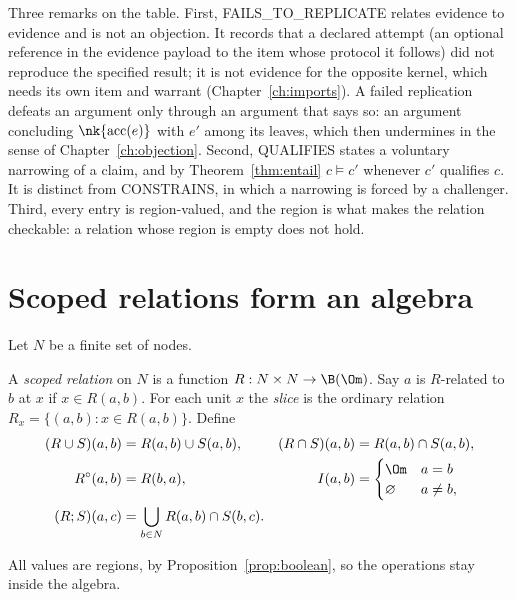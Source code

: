 Three remarks on the table. First, \textsf{FAILS\_TO\_REPLICATE} relates evidence to evidence and is not an objection. It records that a declared attempt (an optional reference in the evidence payload to the item whose protocol it follows) did not reproduce the specified result; it is not evidence for the opposite kernel, which needs its own item and warrant (Chapter~\ref{ch:imports}). A failed replication defeats an argument only through an argument that says so: an argument concluding $\nk{\mathrm{acc}(e)}$ with $e'$ among its leaves, which then undermines in the sense of Chapter~\ref{ch:objection}. Second, \textsf{QUALIFIES} states a voluntary narrowing of a claim, and by Theorem~\ref{thm:entail} $c\models c'$ whenever $c'$ qualifies $c$. It is distinct from \textsf{CONSTRAINS}, in which a narrowing is forced by a challenger. Third, every entry is region-valued, and the region is what makes the relation checkable: a relation whose region is empty does not hold.

\section{Scoped relations form an algebra}

Let $N$ be a finite set of nodes.

\begin{definition}\label{def:scopedrel}
A \emph{scoped relation} on $N$ is a function $R:N\times N\to\B(\Om)$. Say $a$ is $R$-related to $b$ at $x$ if $x\in R(a,b)$. For each unit $x$ the \emph{slice} is the ordinary relation $R_x=\{(a,b):x\in R(a,b)\}$. Define
\begin{align*}
(R\cup S)(a,b)&=R(a,b)\cup S(a,b), & (R\cap S)(a,b)&=R(a,b)\cap S(a,b),\\
R^{\circ}(a,b)&=R(b,a), & I(a,b)&=\begin{cases}\Om&a=b\\\varnothing&a\ne b,\end{cases}\\
(R;S)(a,c)&=\bigcup_{b\in N}R(a,b)\cap S(b,c).
\end{align*}
\end{definition}

All values are regions, by Proposition~\ref{prop:boolean}, so the operations stay inside the algebra.

